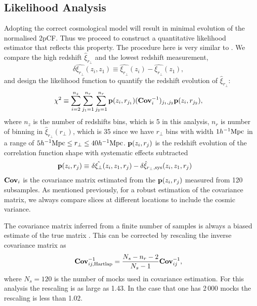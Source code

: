 \documentclass[iop]{emulateapj}
\begin{document}
\subsection{Likelihood Analysis}


Adopting the correct cosmological model will result in minimal evolution of the normalised 2pCF.
Thus we proceed to construct a quantitative likelihood estimator that reflects this property.
The procedure here is very similar to \cite{Li2014,Li2015,Li2016}.
We compare the high redshift $\hat\xi_{r_\perp}$ and the lowest redshift measurement,
\begin{equation}
 \delta \hat{\xi_{r_\perp}}(z_i,z_1) \equiv \hat{\xi_{r_\perp}}(z_i) - \hat{\xi_{r_\perp}}(z_1),
\end{equation}
and design the likelihood function to quantify
the redshift evolution of $\hat\xi_{r_\perp}$:
\begin{equation}\label{eq:chisq1}
\chi^2\equiv \sum_{i=2}^{n_{z}} \sum_{j_1=1}^{n_{r}} \sum_{j_2=1}^{n_{r}} {\bf p}(z_i,r_{j_1}) ({\bf Cov}_{i}^{-1})_{j_1,j_2}  {\bf p}(z_i,r_{j_2}),
\end{equation}
where $n_z$ is the number of redshifts bins, which is 5 in this analysis, 
$n_r$ is number of binning in $\hat{\xi}_{r_\perp}(r_\perp)$,
which is 35 since we have $r_\perp$ bins 
with width $1h^{-1}\rm Mpc$ in a range of $5h^{-1}{\rm Mpc}\leq r_\perp\leq 40h^{-1}{\rm Mpc}$.
${\bf p}(z_i,r_{j})$ is the redshift evolution of the correlation function shape with systematic effects subtracted
\begin{eqnarray}\label{eq:bfp}
 {\bf p}(z_i,r_{j}) \equiv&\ \delta \hat{\xi_\perp}(z_i,z_1,r_j) - \delta \hat{\xi}_{r_\perp,\rm sys}(z_i,z_1,r_j)
\end{eqnarray}
${\bf Cov}_i$ is the covariance matrix estimated from the ${\bf p}(z_i,r_{j})$ measured from 120 subsamples.
As mentioned previously, for a robust estimation of the covariance matrix, 
we always compare slices at different locations to 
include the cosmic variance.

The covariance matrix inferred from a finite number of samples
is always a biased estimate of the true matrix \citep{Hartlap}.
This can be corrected by rescaling the inverse covariance matrix as 
\begin{equation}
 {\bf Cov}^{-1}_{ij,\rm Hartlap} = \frac{N_s - n_{r}-2}{N_s-1} {\bf Cov}^{-1}_{ij},
\end{equation}
where $N_s=120$ is the number of mocks used in covariance estimation.
For this analysis the rescaling is as large as 1.43.
In the case that one has 2\,000 mocks the rescaling is less than 1.02.
\end{document}
